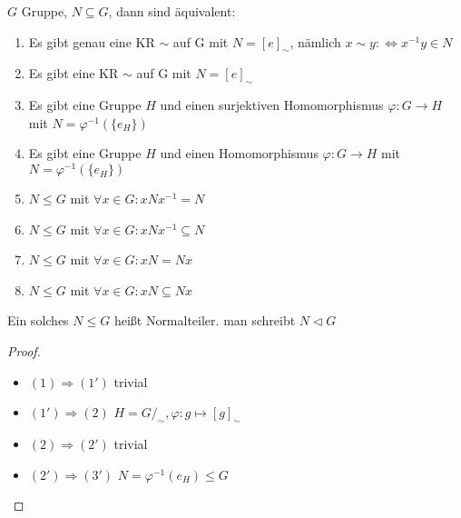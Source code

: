 \begin{theorem}
    $G$ Gruppe, $N \subseteq G$, dann sind äquivalent:
    \begin{enumerate}[label=(\alph*)]
        \item Es gibt genau eine KR $\sim$ auf G mit $N = [e]_\sim$, nämlich $x \sim y: \Leftrightarrow x^{-1}y \in N$
        \item Es gibt eine KR $\sim$ auf G mit $N = [e]_\sim$
        \item Es gibt eine Gruppe $H$ und einen surjektiven Homomorphismus $\varphi: G \to H$ mit $N = \varphi^{-1}(\{e_H\})$
        \item Es gibt eine Gruppe $H$ und einen Homomorphismus $\varphi: G \to H$ mit $N = \varphi^{-1}(\{e_H\})$
        \item $N \le G$ mit $\forall x \in G: xNx^{-1} = N$
        \item $N \le G$ mit $\forall x \in G: xNx^{-1} \subseteq N$
        \item $N \le G$ mit $\forall x \in G: xN = Nx$
        \item $N \le G$ mit $\forall x \in G: xN \subseteq Nx$
    \end{enumerate}
\end{theorem}

\begin{definition}
    Ein solches $N \le G$ heißt Normalteiler. man schreibt $N\vartriangleleft G$
\end{definition}

\begin{proof}\phantom{.}
    \begin{itemize}[label={--}, topsep=0cm]
        \item $(1) \Rightarrow (1')$ trivial
        \item $(1') \Rightarrow (2)$ $H = G/_{\sim}, \varphi: g \mapsto [g]_\sim $
        \item $(2) \Rightarrow (2')$ trivial
        \item $(2') \Rightarrow (3')$ $N = \varphi^{-1}(e_H) \le G$
    \end{itemize}
\end{proof}
